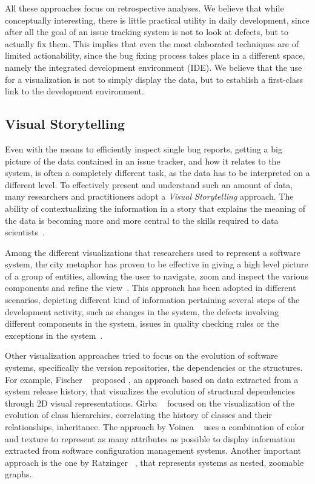 All these approaches focus on retrospective analyses.
We believe that while conceptually interesting, there is little practical utility in daily development, since after all the goal of an issue tracking system is not to look at defects, but to actually fix them.
This implies that even the most elaborated techniques are of limited actionability, since the bug fixing process takes place in a different space, namely the integrated development environment (IDE).
We believe that the use for a visualization is not to simply display the data, but to establish a first-class link to the development environment.


\subsection{Visual Storytelling}

Even with the means to efficiently inspect single bug reports, getting a big picture of the data contained in an issue tracker, and how it relates to the system, is often a completely different task, as the data has to be interpreted on a different level.
To effectively present and understand such an amount of data, many researchers and practitioners adopt a \emph{Visual Storytelling} approach.
The ability of contextualizing the information in a story that explains the meaning of the data is becoming more and more central to the skills required to data scientists~\cite{Segel2010a}.

Among the different visualizations that researchers used to represent a software system, the city metaphor has proven to be effective in giving a high level picture of a group of entities, allowing the user to navigate, zoom and inspect the various components and refine the view~\cite{Wett2011a}.
This approach has been adopted in different scenarios, depicting different kind of information pertaining several steps of the development activity, such as changes in the system, the defects involving different components in the system, issues in quality checking rules or the exceptions in the system~\cite{Panas2003a}.

Other visualization approaches tried to focus on the evolution of software systems, specifically the version repositories, the dependencies or the structures.
For example, Fischer \etal~\cite{Fisch2006a} proposed , an approach based on data extracted from a system release history, that visualizes the evolution of structural dependencies through 2D visual representations.
Girba \etal~\cite{Girb2005a} focused on the visualization of the evolution of class hierarchies, correlating the history of classes and their relationships, \eg inheritance.
The approach by Voinea \etal~\cite{Voin2007a} uses a combination of color and texture to represent as many attributes as possible to display information extracted from software configuration management systems.
Another important approach is the one by Ratzinger \etal~\cite{Ratz2005a}, that represents systems as nested, zoomable graphs.

